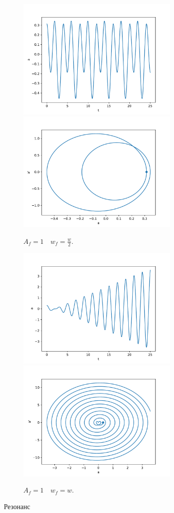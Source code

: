             \begin{figure}[H]
                \centering
                \includegraphics[width=8cm]{pictures/4resonance2.pdf}
                \includegraphics[width=8cm]{pictures/4resonance2p.pdf}
                \caption{$A_f = 1 \quad w_f = \frac{w}{2}$.}
            \end{figure}

            \begin{figure}[H]
                \centering
                \includegraphics[width=8cm]{pictures/4resonance3.pdf}
                \includegraphics[width=8cm]{pictures/4resonance3p.pdf}
                \caption{$A_f = 1 \quad w_f = w$.}
            \end{figure}
            Резонанс

